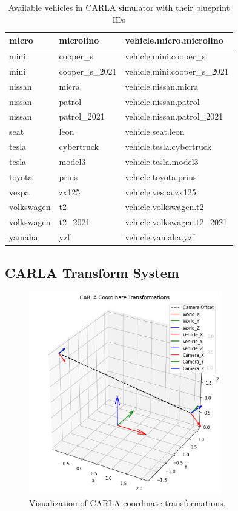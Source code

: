 \begin{table}[h!]
\begin{tabular}{|l|l|l|}
\hline
micro & microlino & vehicle.micro.microlino \\
\hline
mini & cooper\_s & vehicle.mini.cooper\_s \\
\hline
mini & cooper\_s\_2021 & vehicle.mini.cooper\_s\_2021 \\
\hline
nissan & micra & vehicle.nissan.micra \\
\hline
nissan & patrol & vehicle.nissan.patrol \\
\hline
nissan & patrol\_2021 & vehicle.nissan.patrol\_2021 \\
\hline
seat & leon & vehicle.seat.leon \\
\hline
tesla & cybertruck & vehicle.tesla.cybertruck \\
\hline
tesla & model3 & vehicle.tesla.model3 \\
\hline
toyota & prius & vehicle.toyota.prius \\
\hline
vespa & zx125 & vehicle.vespa.zx125 \\
\hline
volkswagen & t2 & vehicle.volkswagen.t2 \\
\hline
volkswagen & t2\_2021 & vehicle.volkswagen.t2\_2021 \\
\hline
yamaha & yzf & vehicle.yamaha.yzf \\
\hline
\end{tabular}
\caption{Available vehicles in CARLA simulator with their blueprint IDs}
\label{tab:carla-vehicles}
\end{table}

\subsection{CARLA Transform System}

\begin{figure}[h!]
    \centering
    \includegraphics[width=0.75\textwidth]{Figures/Methods/Carla_transformations.png}
    \caption{Visualization of CARLA coordinate transformations.}
    \label{fig:Carla_transformations}
\end{figure}

